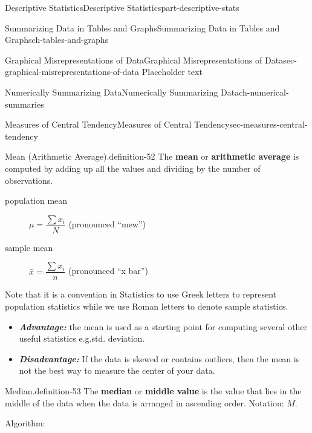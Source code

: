 \documentclass[oneside,10pt,]{book}
\newcommand{\alert}[1]{\textbf{\textit{#1}}}
\newcommand{\terminology}[1]{\textbf{#1}}
\numberwithin{equation}{section}
\begin{document}
\begin{partptx}{Descriptive Statistics}{}{Descriptive Statistics}{}{}{part-descriptive-stats}
\begin{chapterptx}{Summarizing Data in Tables and Graphs}{}{Summarizing Data in Tables and Graphs}{}{}{ch-tables-and-graphs}
\begin{sectionptx}{Graphical Misrepresentations of Data}{}{Graphical Misrepresentations of Data}{}{}{sec-graphical-misrepresentations-of-data}
\hypertarget{p-81}{}%
Placeholder text%
\end{sectionptx}
\end{chapterptx}
%
\typeout{************************************************}
\typeout{************************************************}
%
\begin{chapterptx}{Numerically Summarizing Data}{}{Numerically Summarizing Data}{}{}{ch-numerical-summaries}
%
%
\typeout{************************************************}
\typeout{************************************************}
%
\begin{sectionptx}{Measures of Central Tendency}{}{Measures of Central Tendency}{}{}{sec-measures-central-tendency}
\begin{definition}{Mean (Arithmetic Average).}{definition-52}%
\hypertarget{p-82}{}%
The \terminology{mean} or \terminology{arithmetic average} is computed by adding up all the values and dividing by the number of observations.%
\leavevmode%
\begin{description}
\item[{population mean}]\hypertarget{li-43}{} \(\mu = \dfrac{\sum x_i}{N}\) (pronounced ``mew'')\item[{sample mean}]\hypertarget{li-44}{}\hypertarget{p-83}{}%
\(\bar{x} = \dfrac{\sum x_i}{n}\) (pronounced ``x bar'')%
\end{description}
\hypertarget{p-84}{}%
Note that it is a convention in Statistics to use Greek letters to represent population statistics while we use Roman letters to denote sample statistics.%
\leavevmode%
\begin{itemize}[label=\textbullet]
\item{}\alert{Advantage:} the mean is used as a starting point for computing several other useful statistics e.g.\@ std. deviation.%
\item{}\alert{Disadvantage:} If the data is skewed or contains outliers, then the mean is not the best way to measure the center of your data.%
\end{itemize}
\end{definition}
\begin{definition}{Median.}{definition-53}%
\hypertarget{p-85}{}%
The \terminology{median} or \terminology{middle value} is the value that lies in the middle of the data when the data is arranged in ascending order. Notation: \(M\).%
\par
\hypertarget{p-86}{}%
Algorithm:\leavevmode%

\end{definition}
\end{sectionptx}
\end{chapterptx}
\end{partptx}
\end{document}

